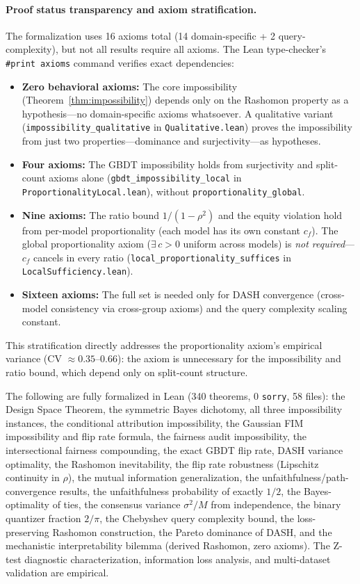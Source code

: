\documentclass{article}
\begin{document}
\paragraph{Proof status transparency and axiom stratification.}
\begin{sloppypar}
The formalization uses 16 axioms total (14 domain-specific + 2 query-complexity),
but not all results require all axioms. The Lean type-checker's
\texttt{\#print axioms} command verifies exact dependencies:
\begin{itemize}
\item \textbf{Zero behavioral axioms:} The core impossibility
(Theorem~\ref{thm:impossibility}) depends only on the Rashomon property as a
hypothesis---no domain-specific axioms whatsoever. A qualitative variant
(\texttt{impossibility\allowbreak\_qualitative} in \texttt{Qualitative.lean}) proves
the impossibility from just two properties---dominance and surjectivity---as
hypotheses.
\item \textbf{Four axioms:} The GBDT impossibility holds from surjectivity and
split-count axioms alone (\texttt{gbdt\allowbreak\_impossibility\allowbreak\_local}
in \texttt{Proportionality\allowbreak Local.lean}), without
\texttt{proportionality\allowbreak\_global}.
\item \textbf{Nine axioms:} The ratio bound $1/(1{-}\rho^2)$ and the equity
violation hold from per-model proportionality (each model has its own constant $c_f$).
The global proportionality axiom ($\exists\, c > 0$ uniform across models) is
\emph{not required}---$c_f$ cancels in every ratio
(\texttt{local\allowbreak\_proportionality\allowbreak\_suffices} in
\texttt{LocalSufficiency.lean}).
\item \textbf{Sixteen axioms:} The full set is needed only for DASH convergence
(cross-model consistency via cross-group axioms) and the query complexity scaling
constant.
\end{itemize}
\end{sloppypar}
This stratification directly addresses the proportionality axiom's empirical variance (CV $\approx 0.35$--$0.66$): the axiom is unnecessary for the impossibility and ratio bound, which depend only on split-count structure.

The following are fully formalized in Lean (340 theorems, 0 \texttt{sorry}, 58 files): the Design Space Theorem, the symmetric Bayes dichotomy, all three impossibility instances, the conditional attribution impossibility, the Gaussian FIM impossibility and flip rate formula, the fairness audit impossibility, the intersectional fairness compounding, the exact GBDT flip rate, DASH variance optimality, the Rashomon inevitability, the flip rate robustness (Lipschitz continuity in $\rho$), the mutual information generalization, the unfaithfulness/path-convergence results, the unfaithfulness probability of exactly $1/2$, the Bayes-optimality of ties, the consensus variance $\sigma^2/M$ from independence, the binary quantizer fraction $2/\pi$, the Chebyshev query complexity bound, the loss-preserving Rashomon construction, the Pareto dominance of DASH, and the mechanistic interpretability bilemma (derived Rashomon, zero axioms). The Z-test diagnostic characterization, information loss analysis, and multi-dataset validation are empirical.
\end{document}
